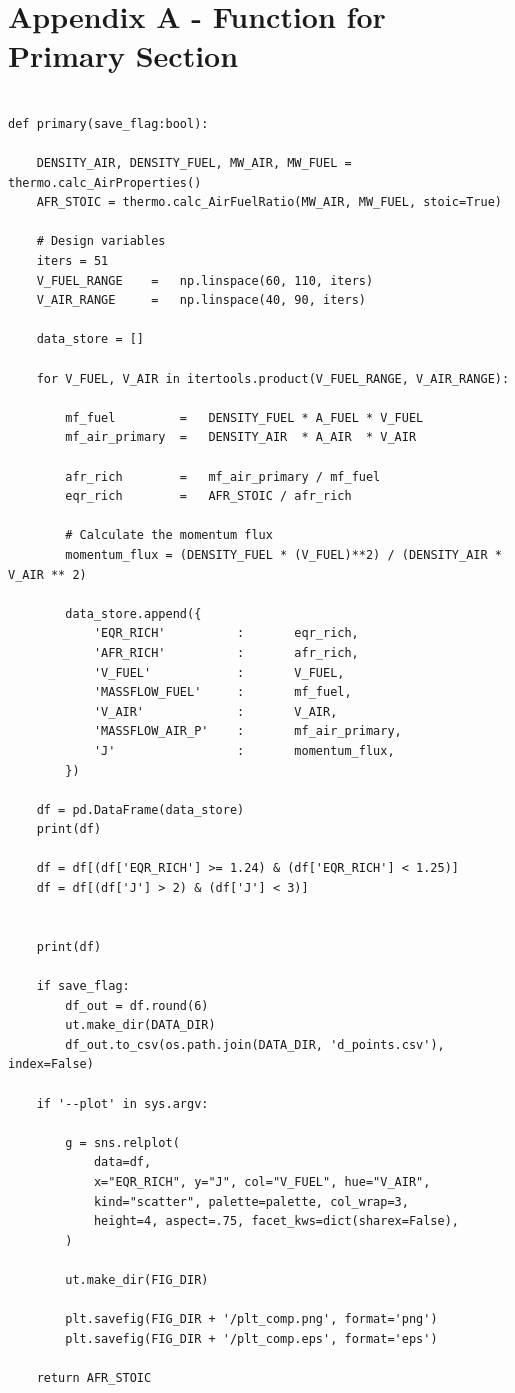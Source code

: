 \section*{Appendix A - Function for Primary Section}\label{subsection:primary_calcs}

\begin{verbatim}

def primary(save_flag:bool):

    DENSITY_AIR, DENSITY_FUEL, MW_AIR, MW_FUEL = thermo.calc_AirProperties()
    AFR_STOIC = thermo.calc_AirFuelRatio(MW_AIR, MW_FUEL, stoic=True)

    # Design variables
    iters = 51
    V_FUEL_RANGE    =   np.linspace(60, 110, iters)
    V_AIR_RANGE     =   np.linspace(40, 90, iters)

    data_store = []

    for V_FUEL, V_AIR in itertools.product(V_FUEL_RANGE, V_AIR_RANGE):

        mf_fuel         =   DENSITY_FUEL * A_FUEL * V_FUEL
        mf_air_primary  =   DENSITY_AIR  * A_AIR  * V_AIR

        afr_rich        =   mf_air_primary / mf_fuel
        eqr_rich        =   AFR_STOIC / afr_rich

        # Calculate the momentum flux
        momentum_flux = (DENSITY_FUEL * (V_FUEL)**2) / (DENSITY_AIR * V_AIR ** 2)

        data_store.append({
            'EQR_RICH'          :       eqr_rich,
            'AFR_RICH'          :       afr_rich,
            'V_FUEL'            :       V_FUEL,
            'MASSFLOW_FUEL'     :       mf_fuel,
            'V_AIR'             :       V_AIR,
            'MASSFLOW_AIR_P'    :       mf_air_primary,
            'J'                 :       momentum_flux,
        })

    df = pd.DataFrame(data_store)
    print(df)

    df = df[(df['EQR_RICH'] >= 1.24) & (df['EQR_RICH'] < 1.25)]
    df = df[(df['J'] > 2) & (df['J'] < 3)]


    print(df)

    if save_flag:
        df_out = df.round(6)
        ut.make_dir(DATA_DIR)
        df_out.to_csv(os.path.join(DATA_DIR, 'd_points.csv'), index=False)

    if '--plot' in sys.argv:
        
        g = sns.relplot(
            data=df,
            x="EQR_RICH", y="J", col="V_FUEL", hue="V_AIR",
            kind="scatter", palette=palette, col_wrap=3,
            height=4, aspect=.75, facet_kws=dict(sharex=False),
        )

        ut.make_dir(FIG_DIR)

        plt.savefig(FIG_DIR + '/plt_comp.png', format='png')
        plt.savefig(FIG_DIR + '/plt_comp.eps', format='eps')
    
    return AFR_STOIC
\end{verbatim}

